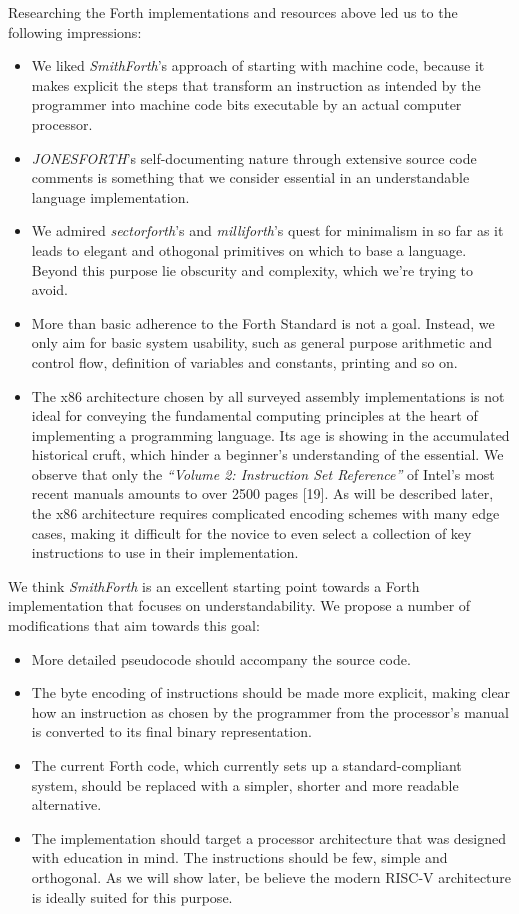 \documentclass[a4paper,12pt,final]{article}
\makeatletter
\newcommand{\citeprocitem}[2]{\hyper@linkstart{cite}{citeproc_bib_item_#1}#2\hyper@linkend}
\makeatother
\begin{document}
Researching the Forth implementations and resources above led us to
the following impressions:
\begin{itemize}
\item We liked \emph{SmithForth}'s approach of starting with machine code,
because it makes explicit the steps that transform an instruction as
intended by the programmer into machine code bits executable by an
actual computer processor.
\item \emph{JONESFORTH}'s self-documenting nature through extensive source code
comments is something that we consider essential in an
understandable language implementation.
\item We admired \emph{sectorforth}'s and \emph{milliforth}'s quest for minimalism
in so far as it leads to elegant and othogonal primitives on which
to base a language. Beyond this purpose lie obscurity and
complexity, which we're trying to avoid.
\item More than basic adherence to the Forth Standard is not a
goal. Instead, we only aim for basic system usability, such as
general purpose arithmetic and control flow, definition of variables
and constants, printing and so on.
\item The x86 architecture chosen by all surveyed assembly implementations
is not ideal for conveying the fundamental computing principles at
the heart of implementing a programming language.  Its age is
showing in the accumulated historical cruft, which hinder a
beginner's understanding of the essential.  We observe that only the
\emph{``Volume 2: Instruction Set Reference''} of Intel's most recent
manuals amounts to over 2500 pages \citeprocitem{19}{[19]}.
As will be described later, the x86 architecture requires
complicated encoding schemes with many edge cases, making it
difficult for the novice to even select a collection of key
instructions to use in their implementation.
\end{itemize}

We think \emph{SmithForth} is an excellent starting point towards a Forth
implementation that focuses on understandability.  We propose a number
of modifications that aim towards this goal:
\begin{itemize}
\item More detailed pseudocode should accompany the source code.
\item The byte encoding of instructions should be made more explicit,
making clear how an instruction as chosen by the programmer from the
processor's manual is converted to its final binary representation.
\item The current Forth code, which currently sets up a standard-compliant
system, should be replaced with a simpler, shorter and more readable
alternative.
\item The implementation should target a processor architecture that was
designed with education in mind.  The instructions should be few,
simple and orthogonal.  As we will show later, be believe the modern
RISC-V architecture is ideally suited for this purpose.
\end{itemize}
\end{document}
